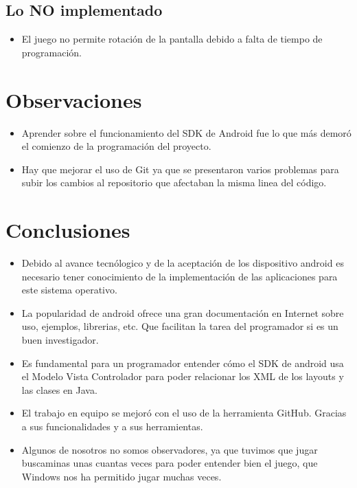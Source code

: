 \documentclass[11pt]{article} %
\begin{document}
\subsection{Lo NO implementado} 
\begin{itemize}
\item El juego no permite rotación de la pantalla debido a falta de tiempo de programación. 
\end {itemize}

\section{Observaciones}
\begin{itemize}
\item Aprender sobre el funcionamiento del SDK de Android fue lo que más demoró el comienzo de la programación del proyecto.
\item Hay que mejorar el uso de Git ya que se presentaron varios problemas para subir los cambios al repositorio que afectaban la misma linea del código.
\end{itemize}
\section{ Conclusiones}

\begin{itemize}
\item Debido al avance tecnólogico y de la aceptación de los dispositivo android es necesario tener conocimiento de la implementación de las aplicaciones para este sistema operativo.
\item La popularidad de android ofrece una gran documentación en Internet sobre uso, ejemplos, librerias, etc. Que facilitan la tarea del programador si es un buen investigador.
\item Es fundamental para un programador entender cómo el SDK de android usa el Modelo Vista Controlador para poder relacionar los XML de los layouts y las clases en Java.
\item El trabajo en equipo se mejoró con el uso de la herramienta GitHub. Gracias a sus funcionalidades y a sus herramientas.
\item Algunos de nosotros no somos observadores, ya que tuvimos que jugar buscaminas unas cuantas veces para poder entender bien el juego, que Windows nos ha permitido jugar muchas veces.

\end {itemize}
\end{document}
